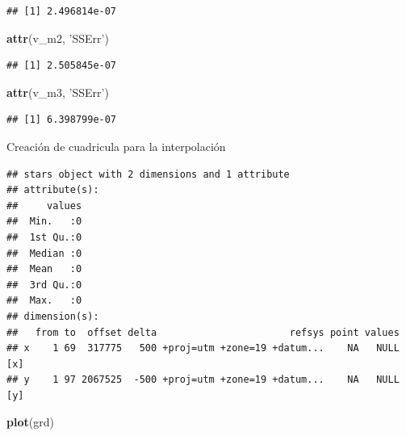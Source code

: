 \documentclass[11pt,]{article}
\newenvironment{Shaded}{\begin{snugshade}}{\end{snugshade}}
\newcommand{\KeywordTok}[1]{\textcolor[rgb]{0.13,0.29,0.53}{\textbf{#1}}}
\newcommand{\DataTypeTok}[1]{\textcolor[rgb]{0.13,0.29,0.53}{#1}}
\newcommand{\DecValTok}[1]{\textcolor[rgb]{0.00,0.00,0.81}{#1}}
\newcommand{\StringTok}[1]{\textcolor[rgb]{0.31,0.60,0.02}{#1}}
\newcommand{\CommentTok}[1]{\textcolor[rgb]{0.56,0.35,0.01}{\textit{#1}}}
\newcommand{\OperatorTok}[1]{\textcolor[rgb]{0.81,0.36,0.00}{\textbf{#1}}}
\newcommand{\NormalTok}[1]{#1}
\begin{document}
\begin{verbatim}
## [1] 2.496814e-07
\end{verbatim}

\begin{Shaded}
\begin{Highlighting}[]
\KeywordTok{attr}\NormalTok{(v_m2, }\StringTok{'SSErr'}\NormalTok{) }
\end{Highlighting}
\end{Shaded}

\begin{verbatim}
## [1] 2.505845e-07
\end{verbatim}

\begin{Shaded}
\begin{Highlighting}[]
\KeywordTok{attr}\NormalTok{(v_m3, }\StringTok{'SSErr'}\NormalTok{)}
\end{Highlighting}
\end{Shaded}

\begin{verbatim}
## [1] 6.398799e-07
\end{verbatim}

Creación de cuadricula para la interpolación

\begin{Shaded}
\end{Shaded}

\begin{verbatim}
## stars object with 2 dimensions and 1 attribute
## attribute(s):
##     values  
##  Min.   :0  
##  1st Qu.:0  
##  Median :0  
##  Mean   :0  
##  3rd Qu.:0  
##  Max.   :0  
## dimension(s):
##   from to  offset delta                       refsys point values    
## x    1 69  317775   500 +proj=utm +zone=19 +datum...    NA   NULL [x]
## y    1 97 2067525  -500 +proj=utm +zone=19 +datum...    NA   NULL [y]
\end{verbatim}

\begin{Shaded}
\begin{Highlighting}[]
\KeywordTok{plot}\NormalTok{(grd)}
\end{Highlighting}
\end{Shaded}
\end{document}
